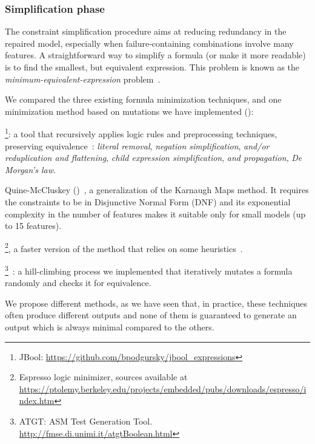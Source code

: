 \begin{tikzborder}{\cite{Gargantini16:validation}}
\begin{tikzborder}{\cite{gargantini_combinatorial_2017}}
\begin{tikzborder}{\cite{garn2019}}
\begin{tikzborder}{\cite{arcaini2019achieving}}
\begin{tikzborder}{\cite{arcaini2019varivolution}}
		\subsubsection{\textsf{Simplification} phase}\label{sec:simplification}
		\bb The constraint \textsf{simplification} procedure aims at reducing redundancy in the repaired model, especially when failure-containing combinations involve many features. A straightforward way to simplify a formula (or make it more readable) is to find the smallest, but equivalent expression. This problem is known as the \textit{minimum-equivalent-expression} problem~\cite{Buchfuhrer:2011:CBF:1889388.1889508, hemaspaandra_minimization_2011}.
		
		We compared the three existing formula minimization techniques, and one minimization method based on mutations we have implemented (\atgt):
		\begin{compactenum}
			\item \jbool\footnote{JBool: \url{https://github.com/bpodgursky/jbool_expressions}}: a tool that recursively applies logic rules and preprocessing techniques, preserving equivalence~\cite{Biere2012}: \textit{literal removal}, \textit{negation simplification}, \textit{and/or reduplication and flattening}, \textit{child expression simplification}, \textit{and propagation}, \textit{De Morgan's law}.
			\item \textsf{Quine-McCluskey} (\qm)~\cite{Quine3}, a generalization of the Karnaugh Maps method. It requires the constraints to be in Disjunctive Normal Form (DNF) and its exponential complexity in the number of features makes it suitable only for small models (up to 15 features).
			\item \espresso\footnote{Espresso logic minimizer, sources available at \url{https://ptolemy.berkeley.edu/projects/embedded/pubs/downloads/espresso/index.htm}}, a faster version of the \qm method that relies on some heuristics~\cite{Rudell:M86/65}.
			\item \atgt\footnote{ATGT: ASM Test Generation Tool. \url{http://fmse.di.unimi.it/atgtBoolean.html}}~\cite{CalvagnaG09}: a hill-climbing process we implemented that iteratively mutates a formula randomly and checks it for equivalence. %
		\end{compactenum}
		
		We propose different methods, as we have seen that, in practice, these techniques often produce different outputs and none of them is guaranteed to generate an output which is always minimal compared to the others.\be
		

\end{tikzborder}
\end{tikzborder}
\end{tikzborder}
\end{tikzborder}
\end{tikzborder}
